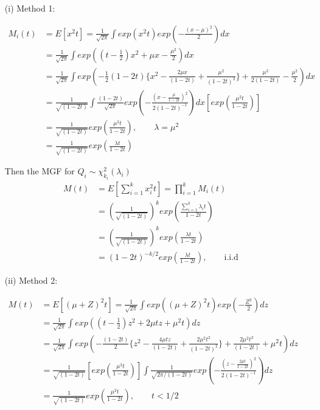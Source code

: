 \documentclass[11pt]{article} %
\begin{document}
\begin{itemize}
	\item [(i)] Method 1:
	
	\begin{align*}
		M_i(t) &= E[x^2 t] = \frac{1}{\sqrt{2\pi}} \int exp(x^2 t) exp \left( - \frac{(x-\mu)^2}{2} \right) dx\\
		&=  \frac{1}{\sqrt{2\pi}}  \int exp \left( (t- \frac{1}{2}) x^2 + \mu x -\frac{\mu^2}{2} \right) dx \\
		&=  \frac{1}{\sqrt{2\pi}}  \int exp \left(  -\frac{1}{2}(1-2t) \{ x^2 - \frac{2 \mu x}{(1-2t)} + \frac{\mu^2}{(1-2t)^2} \} + \frac{\mu^2}{2(1-2t)} -\frac{\mu^2}{2}  \right) dx \\
		&= \frac{1}{\sqrt{(1-2t)}} \int \frac{(1-2t)}{\sqrt{2\pi}} exp\left( -\frac{(x-\frac{\mu}{1-2t})^2}{2 (1-2t)^{-1}} \right) dx \left[exp \left( \frac{\mu^2 t}{1-2t} \right) \right]\\
		&=\frac{1}{\sqrt{(1-2t)}} exp \left( \frac{\mu^2 t}{1-2t} \right), \qquad \lambda = \mu^2\\
		&=\frac{1}{\sqrt{(1-2t)}} exp \left( \frac{\lambda t}{1-2t} \right)
	\end{align*}
	
	Then the MGF for $Q_i \sim \chi^2 _{k_i}(\lambda_i)$
	\begin{align*}
		M(t) &= E[ \sum_{i=1}^k x_i^2 t] = \prod_{i=1}^k M_i(t) \\
		&=\left(\frac{1}{\sqrt{(1-2t)}} \right)^k exp \left( \frac{ \sum_{i=1}^k \lambda_i t }{1-2t} \right)\\
		&=\left(\frac{1}{\sqrt{(1-2t)}} \right)^k exp \left( \frac{ \lambda t }{1-2t} \right)\\
		&= (1-2t)^{-k/2} exp \left( \frac{ \lambda t }{1-2t} \right), \qquad \text{i.i.d}
	\end{align*}
	
	\item[(ii)] Method 2:
	
	\begin{align*}
	M(t) &= E[(\mu + Z)^2 t] = \frac{1}{\sqrt{2\pi}} \int exp \left((\mu + Z)^2 t \right) exp \left( - \frac{Z^2}{2} \right) dz\\
	&=  \frac{1}{\sqrt{2\pi}}  \int exp \left( (t- \frac{1}{2}) z^2 + 2\mu t z + \mu^2 t \right) dz \\
	&=  \frac{1}{\sqrt{2\pi}}  \int exp \left(  -\frac{(1-2t)}{2} \{ z^2 - \frac{4 \mu t z}{(1-2t)} + \frac{2 \mu^2 t^2}{(1-2t)^2} \} + \frac{2 \mu^2 t^2}{(1-2t)} + \mu^2 t   \right) dz \\
	&= \frac{1}{\sqrt{(1-2t)}} \left[exp \left( \frac{\mu^2 t}{1-2t} \right) \right] \int \frac{1}{\sqrt{2\pi/(1-2t)}} exp\left( -\frac{(z-\frac{2 \mu t}{1-2t})^2}{2 (1-2t)^{-1}} \right) dz \\
	&=\frac{1}{\sqrt{(1-2t)}} exp \left( \frac{\mu^2 t}{1-2t} \right), \qquad t<1/2
\end{align*}


\end{itemize}
\end{document}

